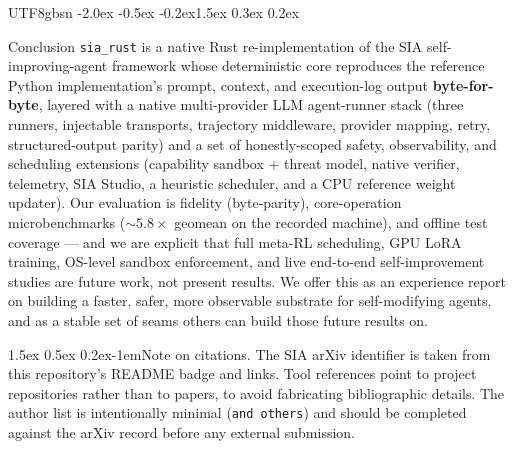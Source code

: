 \documentclass{article}
\makeatletter
\renewcommand{\section}{\@startsection{section}{1}{\z@}%
  {-2.0ex \@plus -0.5ex \@minus -0.2ex}{1.5ex \@plus 0.3ex \@minus 0.2ex}%
  {\large\bfseries\raggedright\color{accent}}}
\renewcommand{\paragraph}{\@startsection{paragraph}{4}{\z@}%
  {1.5ex \@plus 0.5ex \@minus 0.2ex}{-1em}{\normalsize\bfseries\color{accent}}}
\makeatother
\begin{document}
\begin{CJK}{UTF8}{gbsn}
\section{Conclusion}
\texttt{sia\_rust} is a native Rust re-implementation of the SIA
self-improving-agent framework whose deterministic core reproduces the reference
Python implementation's prompt, context, and execution-log output
\textbf{byte-for-byte}, layered with a native multi-provider LLM agent-runner stack
(three runners, injectable transports, trajectory middleware, provider mapping,
retry, structured-output parity) and a set of honestly-scoped safety, observability,
and scheduling extensions (capability sandbox + threat model, native verifier,
telemetry, SIA Studio, a heuristic scheduler, and a CPU reference weight updater).
Our evaluation is fidelity (byte-parity), core-operation microbenchmarks
(${\sim}5.8\times$ geomean on the recorded machine), and offline test coverage ---
and we are explicit that full meta-RL scheduling, GPU LoRA training, OS-level sandbox
enforcement, and live end-to-end self-improvement studies are future work, not
present results. We offer this as an experience report on building a faster, safer,
more observable substrate for self-modifying agents, and as a stable set of seams
others can build those future results on.

\paragraph{Note on citations.} The SIA arXiv identifier is taken from this
repository's README badge and links. Tool references point to project repositories
rather than to papers, to avoid fabricating bibliographic details. The
\citet{hebbar2026sia} author list is intentionally minimal (\texttt{and others}) and
should be completed against the arXiv record before any external submission.




\end{CJK}
\end{document}
